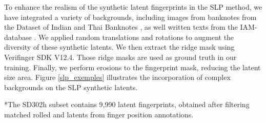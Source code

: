 \documentclass[twocolumn, switch]{article} %
\begin{document}
To enhance the realism of the synthetic latent fingerprints in the SLP \cite{Wyzykowski_2023_WACV} method, we have integrated a variety of backgrounds, including images from banknotes from the Dataset of Indian and Thai Banknotes \cite{cjb5-n039-20}, as well written texts from the IAM-database \cite{marti2002iam}. We applied random translations and rotations to augment the diversity of these synthetic latents. We then extract the ridge mask using Verifinger SDK V12.4. Those ridge masks are used as ground truth in our training. Finally, we perform erosions to the fingerprint mask, reducing the latent size area. Figure \ref{slp_exemples} illustrates the incorporation of complex backgrounds on the SLP synthetic latents.

\begin{table}[H]
\centering
{}
\caption{Summary of latent fingerprint databases}
\label{tableDatabases}
\footnotesize{*The SD302h subset contains 9,990 latent fingerprints, obtained after filtering matched rolled and latents from finger position annotations.}
\vspace{-0.3cm}
\end{table}
\end{document}

